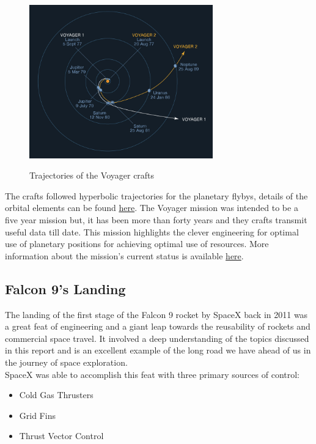 \documentclass[12pt, letterpaper]{article}
\begin{document}
\begin{figure}[H]
	\centering
    \includegraphics[width=300px]{voyager_trajectories}
    \label{fig:voyager_trajectories}
    \caption{Trajectories of the Voyager crafts}
\end{figure}

The crafts followed hyperbolic trajectories for the planetary flybys, details of the orbital elements can be found \href{https://voyager.jpl.nasa.gov/mission/science/hyperbolic-orbital-elements/}{here}. The Voyager mission was intended to be a five year mission but, it has been more than forty years and they crafts transmit useful data till date. This mission highlights the clever engineering for optimal use of planetary positions for achieving optimal use of resources. More information about the mission's current status is available \href{https://voyager.jpl.nasa.gov/mission/status/}{here}.

\subsection{Falcon 9's Landing}
The landing of the first stage of the Falcon 9 rocket by SpaceX back in 2011 was a great feat of engineering and a giant leap towards the reusability of rockets and commercial space travel. It involved a deep understanding of the topics discussed in this report and is an excellent example of the long road we have ahead of us in the journey of space exploration.\\
SpaceX was able to accomplish this feat with three primary sources of control:
\begin{itemize}
  \item Cold Gas Thrusters
  \item Grid Fins
  \item Thrust Vector Control
\end{itemize}
\end{document}
